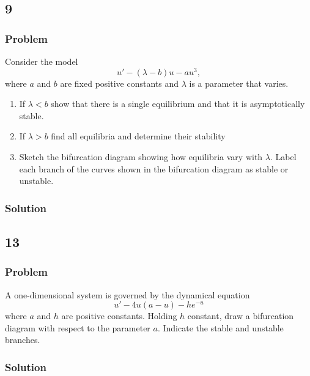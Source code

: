 \documentclass[12pt]{article}
\begin{document}
\subsection{9}
\subsubsection*{Problem}
Consider the model
\begin{equation}
  \label{eq:9-problem}
  u'-(\lambda - b) u-au^3,
\end{equation}
where $a$ and $b$ are fixed positive constants and $\lambda$ is a parameter that
varies.

\begin{enumerate}
\item If $\lambda < b$  show that there is a single equilibrium and that it is
  asymptotically stable.
\item If $\lambda > b$ find all equilibria and determine their stability
\item Sketch the bifurcation diagram showing how equilibria vary with $\lambda$.
  Label each branch of the curves shown in the bifurcation diagram as stable or
  unstable.
\end{enumerate}

\subsubsection*{Solution}
\todo[]

\subsection{13}
\subsubsection*{Problem}
A one-dimensional system is governed by the dynamical equation
\begin{equation}
  \label{eq:13-problem}
  u'-4u(a-u)-he^{-u}
\end{equation}
where $a$ and $h$ are positive constants. Holding $h$ constant, draw a
bifurcation diagram with respect to the parameter $a$. Indicate the stable and
unstable branches.

\subsubsection*{Solution}
\todo[]

\newpage
\end{document}
